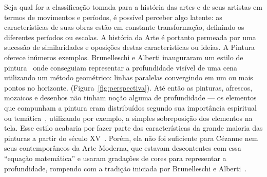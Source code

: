 Seja qual for a classificação tomada para a história das artes e de
seus artistas em termos de movimentos e períodos, é possível perceber
algo latente: as características de suas obras estão em constante
transformação, definindo os diferentes períodos ou escolas. A história
da Arte é portanto permeada por uma sucessão de similaridades e
oposições destas características ou ideias. A Pintura oferece inúmeros
exemplos. Brunelleschi e Alberti inauguraram um estilo de
pintura~\cite{andersen,kemp} onde conseguiam representar a
profundidade visível de uma cena utilizando um método geométrico:
linhas paralelas convergindo em um ou mais pontos no horizonte.
(Figura~\ref{fig:perspectiva}). Até então as pinturas, afrescos,
mozaicos e desenhos não tinham noção alguma de profundidade --- os
elementos que compunham a pintura eram distribuídos segundo sua
importância espiritual ou temática~\cite{edgerton}, utilizando por
exemplo, a simples sobreposição dos elementos na tela. Esse estilo
acabaria por fazer parte das características da grande maioria das
pinturas a partir do século XV~\cite{gombrich}. Porém, ela não foi
suficiente para Cézanne nem seus contemporâneos da Arte Moderna, que
estavam descontentes com essa ``equação matemática'' e usaram
gradações de cores para representar a profundidade, rompendo com a
tradição iniciada por Brunelleschi e Alberti~\cite{sedlmayr}.

